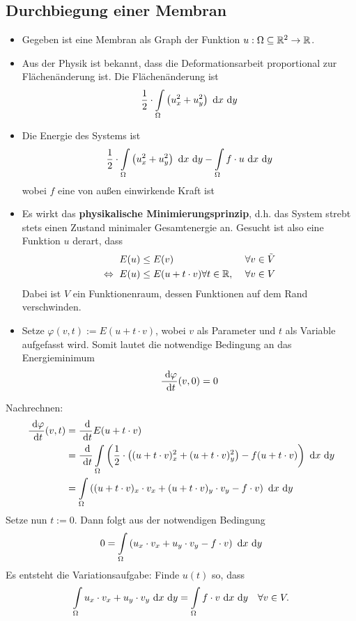 \subsection*{Durchbiegung einer Membran}
\begin{itemize}
\item Gegeben ist eine Membran als Graph der Funktion $u:\Omega\subseteq\mathbb{R}^2\to\mathbb{R}$.
\item Aus der Physik ist bekannt, dass die Deformationsarbeit proportional zur Flächenänderung ist. Die Flächenänderung ist
\begin{align*}
\frac{1}{2}\cdot\int\limits_\Omega\left(u^2_x+u_y^2\right)\text{ d} x\text{ d} y
\end{align*}
\item Die Energie des Systems ist 
\begin{align*}
\frac{1}{2}\cdot\int\limits_\Omega\left(u^2_x+u_y^2\right)\text{ d} x\text{ d} y-\int\limits_\Omega f\cdot u\text{ d} x\text{ d} y
\end{align*}
wobei $f$ eine von außen einwirkende Kraft ist
\item Es wirkt das \textbf{physikalische Minimierungsprinzip}, d.h. das System strebt stets einen Zustand minimaler Gesamtenergie an. Gesucht ist also eine Funktion $u$ derart, dass 
\begin{align*}
	E(u)&\leq E(v)&\forall v\in\tilde{V}\\
	\Leftrightarrow ~ E(u)&\leq E(u+t\cdot v)\forall t\in\mathbb{R},~&\forall v\in V
\end{align*}
Dabei ist $V$ ein Funktionenraum, dessen Funktionen auf dem Rand verschwinden.
\item Setze $\varphi(v,t):=E(u+t\cdot v)$, wobei $v$ als Parameter und $t$ als Variable aufgefasst wird. Somit lautet die notwendige Bedingung an das Energieminimum
\begin{align*}
\frac{\text{ d}\varphi}{\text{ d} t}(v,0)=0
\end{align*}
\end{itemize}
Nachrechnen:
\begin{align*}
\frac{\text{ d}\varphi}{\text{ d} t}(v,t)
&=\frac{\text{ d}}{\text{ d} t}E(u+t\cdot v)\\
&=\frac{\text{ d}}{\text{ d} t}\int\limits_\Omega\left(\frac{1}{2}\cdot\left((u+t\cdot v)_x^2+(u+t\cdot v)_y^2\right)-f(u+t\cdot v)\right)\text{ d} x\text{ d} y\\
&=\int\limits_\Omega\left((u+t\cdot v)_x\cdot v_x+(u+t\cdot v)_y\cdot v_y-f\cdot v\right)\text{ d} x\text{ d} y
\end{align*}
Setze nun $t:=0$. Dann folgt aus der notwendigen Bedingung
\begin{align*}
0=\int\limits_\Omega\left(u_x\cdot v_x+u_y\cdot v_y-f\cdot v\right)\text{ d} x\text{ d} y
\end{align*}
Es entsteht die Variationsaufgabe: Finde $u(t)$ so, dass 
\begin{align*}
\int\limits_\Omega u_x\cdot v_x+u_y\cdot v_y\text{ d} x\text{ d} y=\int\limits_\Omega f\cdot v\text{ d} x\text{ d} y~~~\forall v\in V.
\end{align*}


